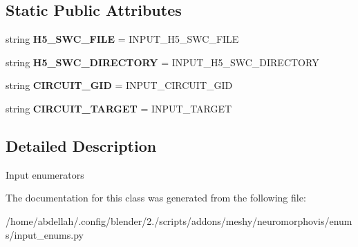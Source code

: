 \subsection*{Static Public Attributes}
\begin{DoxyCompactItemize}
\item 
string {\bfseries H5\+\_\+\+S\+W\+C\+\_\+\+F\+I\+LE} = \textquotesingle{}I\+N\+P\+U\+T\+\_\+\+H5\+\_\+\+S\+W\+C\+\_\+\+F\+I\+LE\textquotesingle{}\hypertarget{classmeshy_1_1neuromorphovis_1_1enums_1_1input__enums_1_1Input_a53c9d74c698caadab6ab8a7f039c4a3f}{}\label{classmeshy_1_1neuromorphovis_1_1enums_1_1input__enums_1_1Input_a53c9d74c698caadab6ab8a7f039c4a3f}

\item 
string {\bfseries H5\+\_\+\+S\+W\+C\+\_\+\+D\+I\+R\+E\+C\+T\+O\+RY} = \textquotesingle{}I\+N\+P\+U\+T\+\_\+\+H5\+\_\+\+S\+W\+C\+\_\+\+D\+I\+R\+E\+C\+T\+O\+RY\textquotesingle{}\hypertarget{classmeshy_1_1neuromorphovis_1_1enums_1_1input__enums_1_1Input_a3c21c3169d82fc3909c9451ed4e0d494}{}\label{classmeshy_1_1neuromorphovis_1_1enums_1_1input__enums_1_1Input_a3c21c3169d82fc3909c9451ed4e0d494}

\item 
string {\bfseries C\+I\+R\+C\+U\+I\+T\+\_\+\+G\+ID} = \textquotesingle{}I\+N\+P\+U\+T\+\_\+\+C\+I\+R\+C\+U\+I\+T\+\_\+\+G\+ID\textquotesingle{}\hypertarget{classmeshy_1_1neuromorphovis_1_1enums_1_1input__enums_1_1Input_a66f5aef2a3337ad9dc2b5c243ceca181}{}\label{classmeshy_1_1neuromorphovis_1_1enums_1_1input__enums_1_1Input_a66f5aef2a3337ad9dc2b5c243ceca181}

\item 
string {\bfseries C\+I\+R\+C\+U\+I\+T\+\_\+\+T\+A\+R\+G\+ET} = \textquotesingle{}I\+N\+P\+U\+T\+\_\+\+T\+A\+R\+G\+ET\textquotesingle{}\hypertarget{classmeshy_1_1neuromorphovis_1_1enums_1_1input__enums_1_1Input_a11fbd34244b86827f3191a76c334865b}{}\label{classmeshy_1_1neuromorphovis_1_1enums_1_1input__enums_1_1Input_a11fbd34244b86827f3191a76c334865b}

\end{DoxyCompactItemize}


\subsection{Detailed Description}


\begin{DoxyVerb}Input enumerators
\end{DoxyVerb}
 

The documentation for this class was generated from the following file\+:\begin{DoxyCompactItemize}
\item 
/home/abdellah/.\+config/blender/2./scripts/addons/meshy/neuromorphovis/enums/input\+\_\+enums.\+py\end{DoxyCompactItemize}
